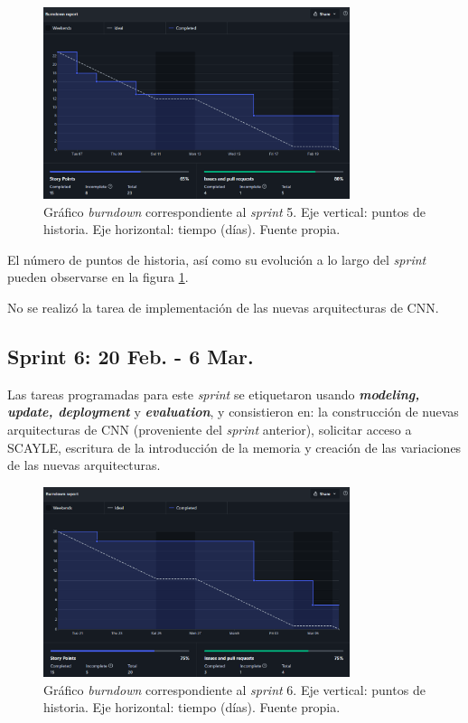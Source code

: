 \begin{figure}[h]
    \centering
    \includegraphics[width=0.8\textwidth]{img/bd_6feb.png}
    \caption{Gráfico \textit{burndown} correspondiente al \textit{sprint} 5. Eje vertical: puntos de historia. Eje horizontal: tiempo (días). Fuente propia.}
    \label{fig:bd_5}
\end{figure}

El número de puntos de historia, así como su evolución a lo largo del \textit{sprint} pueden observarse en la figura \ref{fig:bd_5}.

No se realizó la tarea de implementación de las nuevas arquitecturas de CNN.

\subsection{Sprint 6: 20 Feb. - 6 Mar.}

Las tareas programadas para este \textit{sprint} se etiquetaron usando \textbf{\textit{modeling, update, deployment}} y \textbf{\textit{evaluation}}, y consistieron en: la construcción de nuevas arquitecturas de CNN (proveniente del \textit{sprint} anterior), solicitar acceso a SCAYLE, escritura de la introducción de la memoria y creación de las variaciones de las nuevas arquitecturas. 

\begin{figure}[h]
    \centering
    \includegraphics[width=0.8\textwidth]{img/bd_20feb.png}
    \caption{Gráfico \textit{burndown} correspondiente al \textit{sprint} 6. Eje vertical: puntos de historia. Eje horizontal: tiempo (días). Fuente propia.}
    \label{fig:bd_6}
\end{figure}

